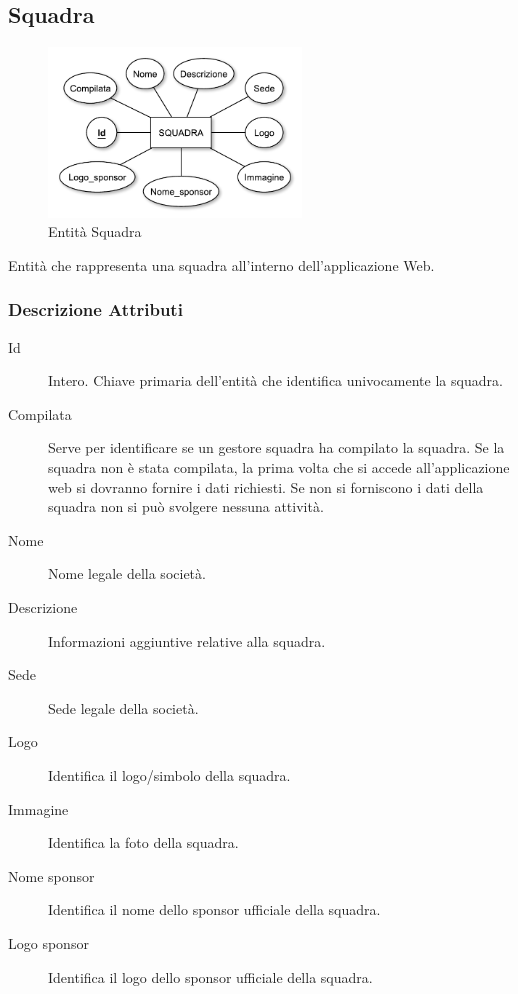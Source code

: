 	\subsection{Squadra}
	
		\begin{figure}[h]
			\centering
			\includegraphics[width=0.6\textwidth]
			{immagini/09-squadra}
			
			\caption{Entità Squadra}
		\end{figure}
		
		Entità che rappresenta una squadra all'interno dell'applicazione Web.
		
		\subsubsection*{Descrizione Attributi}
		
		\begin{description}
			
			\item[Id]
			Intero. Chiave primaria dell'entità che identifica univocamente la squadra.
			
			\item[Compilata]
			Serve per identificare se un gestore squadra ha compilato la squadra. Se la squadra non è stata compilata, la prima volta che si accede all'applicazione web si dovranno fornire i dati richiesti. Se non si forniscono i dati della squadra non si può svolgere nessuna attività.
			
			\item[Nome]
			Nome legale della società.
			
			\item[Descrizione]
			Informazioni aggiuntive relative alla squadra.
			
			\item[Sede]
			Sede legale della società.
			
			\item[Logo]
			Identifica il logo/simbolo della squadra.
			
			\item[Immagine]
			Identifica la foto della squadra.
			
			\item[Nome sponsor]
			Identifica il nome dello sponsor ufficiale della squadra.
			
			\item[Logo sponsor]
			Identifica il logo dello sponsor ufficiale della squadra.
			
		\end{description}
	

